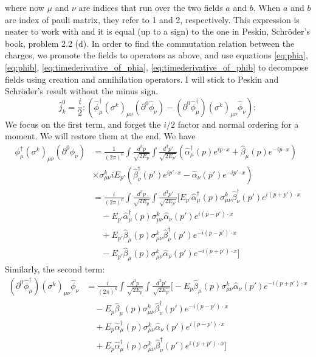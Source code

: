 where now $\mu$ and $\nu$ are indices that run over the two fields $a$ and $b$. When $a$ and $b$ are index of pauli matrix, they refer to 1 and 2, respectively.
 This expression is neater to work with and it is equal (up to a sign) to the one in Peskin, Schr\"{o}der's book, problem 2.2 (d).
In order to find the commutation relation between the charges, we promote the fields to operators as above, 
and use equations \eqref{eq:phia}, \eqref{eq:phib}, \eqref{eq:timederivative_of_phia}, \eqref{eq:timederivative_of_phib} to decompose fields using 
creation and annihilation operators.
I will stick to Peskin and Schr\"{o}der's result without the minus sign. 
\[
\hat j_k^0 = \frac{i}{2} :( \hat \phi^\dagger _\mu (\sigma^k)_{\mu\nu}( \partial^0 \hat \phi_\nu) - (\partial^0 \hat \phi_\mu^\dagger)(\sigma^k)_{\mu\nu}\hat \phi_\nu ):
\]
We focus on the first term, and forget the $i/2$ factor and normal ordering for a moment. We will restore them at the end.
We have
\begin{equation}
\begin{split}
\nonumber
    \phi^\dagger _\mu (\sigma^k)_{\mu\nu}( \partial^0 \phi_\nu) &= \frac{1}{(2\pi)^6} \int \frac{d^3 p}{\sqrt{2E_p}} \int \frac{d^3 p'}{\sqrt{2E_{p'}}} \left( \hat{\alpha}_\mu^\dagger (p) e^{ip\cdot x} + \hat{\beta}_\mu (p) e^{-ip\cdot x} \right)\\
    &\times \sigma^k_{\mu\nu} iE_{p'} \left(\hat{\beta}_\nu^\dagger (p') e^{ip'\cdot x} - \hat{\alpha}_\nu (p') e^{-ip'\cdot x}\right)
    \\
    &=\frac{i}{(2\pi)^6} \int \frac{d^3 p}{\sqrt{2E_p}} \int \frac{d^3 p'}{\sqrt{2E_{p'}}} \bigg[ E_{p'} \hat{\alpha}_\mu^\dagger (p) \sigma^k_{\mu\nu} \hat{\beta}_\nu^\dagger (p') e^{i(p+p')\cdot x} \\
    &\quad - E_{p'} \hat{\alpha}_\mu^\dagger (p) \sigma^k_{\mu\nu} \hat{\alpha}_\nu (p') e^{i(p-p')\cdot x} \\
    &\quad + E_{p'} \hat{\beta}_\mu (p) \sigma^k_{\mu\nu} \hat{\beta}_\nu^\dagger (p') e^{-i(p-p')\cdot x} \\
    &\quad - E_{p'} \hat{\beta}_\mu (p) \sigma^k_{\mu\nu} \hat{\alpha}_\nu (p') e^{-i(p+p')\cdot x} \bigg]
\end{split}
\end{equation}
Similarly, the second term:
\begin{equation}
    \nonumber
\begin{split}
    (\partial^0 \hat{\phi}_\mu^\dagger)(\sigma^k)_{\mu\nu}\hat{\phi}_\nu &= \frac{i}{(2\pi)^6} \int \frac{d^3 p}{\sqrt{2E_p}} \int \frac{d^3 p'}{\sqrt{2E_{p'}}} \bigg[ - E_p \hat{\beta}_\mu (p) \sigma^k_{\mu\nu} \hat{\alpha}_\nu (p') e^{-i(p+p')\cdot x} \\
    &\quad - E_p \hat{\beta}_\mu (p) \sigma^k_{\mu\nu} \hat{\beta}_\nu^\dagger (p') e^{-i(p-p')\cdot x} \\
    &\quad + E_p \hat{\alpha}_\mu^\dagger (p) \sigma^k_{\mu\nu} \hat{\alpha}_\nu (p') e^{i(p-p')\cdot x} \\
    &\quad + E_p \hat{\alpha}_\mu^\dagger (p) \sigma^k_{\mu\nu} \hat{\beta}_\nu^\dagger (p') e^{i(p+p')\cdot x} \bigg]
\end{split}
\end{equation}
